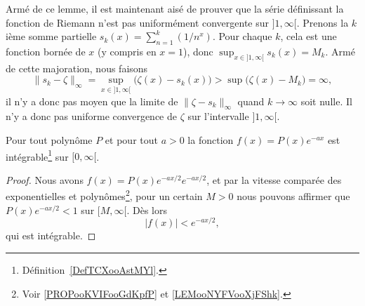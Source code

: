 	Armé de ce lemme, il est maintenant aisé de prouver que la série définissant la fonction de Riemann n'est pas uniformément convergente sur \( ]1,\infty[\). Prenons la \( k\)ième somme partielle \( s_k(x)=\sum_{n=1}^k(1/n^x)\). Pour chaque \( k\), cela est une fonction bornée de \( x\) (y compris en \( x=1\)), donc \( \sup_{x\in]1,\infty[}s_k(x)=M_k\). Armé de cette majoration, nous faisons
\begin{equation}
	\| s_k-\zeta \|_{\infty}=\sup_{x\in]1,\infty[}\big( \zeta(x)-s_k(x) \big)>\sup\big( \zeta(x)-M_k \big)=\infty,
\end{equation}
il n'y a donc pas moyen que la limite de \( \| \zeta-s_k \|_{\infty}\) quand \( k\to\infty\) soit nulle. Il n'y a donc pas uniforme convergence de \( \zeta\) sur l'intervalle \( ]1,\infty[\).

\begin{proposition} \label{PropBQGBooHxNrrf}
	Pour tout polynôme \( P\) et pour tout \( a>0\) la fonction \( f(x)=P(x) e^{-ax}\) est intégrable\footnote{Définition~\ref{DefTCXooAstMYl}.} sur \( \mathopen[ 0 , \infty [\).
\end{proposition}

\begin{proof}
	Nous avons \( f(x)=P(x) e^{-ax/2} e^{-ax/2}\), et par la vitesse comparée des exponentielles et polynômes\footnote{Voir \ref{PROPooKVIFooGdKpfP} et \ref{LEMooNYFVooXjFShk}.}, pour un certain \( M>0\) nous pouvons affirmer que \( P(x) e^{-ax/2}<1\) sur \( \mathopen[ M , \infty [\). Dès lors
	\begin{equation}
		| f(x) |< e^{-ax/2},
	\end{equation}
	qui est intégrable.
\end{proof}

